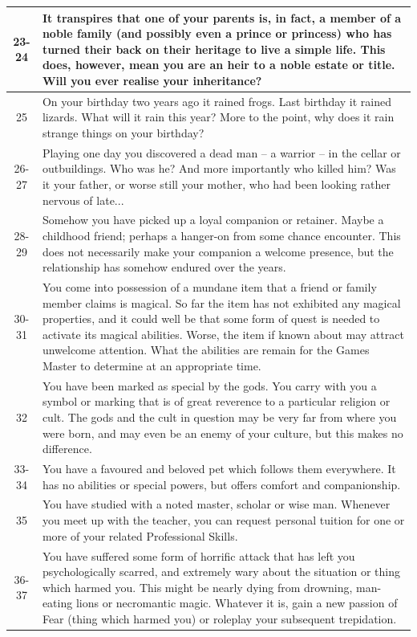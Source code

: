 \documentclass[10pt]{article}
\begin{document}
\begin{longtable}{|c|p{12cm}|}
\hline
23-24 & It transpires that one of your parents is, in fact, a member of a noble family (and possibly even a prince or princess) who has turned their back on their heritage to live a simple life. This does, however, mean you are an heir to a noble estate or title. Will you ever realise your inheritance? \\
\hline
25 & On your birthday two years ago it rained frogs. Last birthday it rained lizards. What will it rain this year? More to the point, why does it rain strange things on your birthday? \\
\hline
26-27 & Playing one day you discovered a dead man – a warrior – in the cellar or outbuildings. Who was he? And more importantly who killed him? Was it your father, or worse still your mother, who had been looking rather nervous of late... \\
\hline
28-29 & Somehow you have picked up a loyal companion or retainer. Maybe a childhood friend; perhaps a hanger-on from some chance encounter. This does not necessarily make your companion a welcome presence, but the relationship has somehow endured over the years. \\
\hline
30-31 & You come into possession of a mundane item that a friend or family member claims is magical. So far the item has not exhibited any magical properties, and it could well be that some form of quest is needed to activate its magical abilities. Worse, the item if known about may attract unwelcome attention. What the abilities are remain for the Games Master to determine at an appropriate time. \\
\hline
32 & You have been marked as special by the gods. You carry with you a symbol or marking that is of great reverence to a particular religion or cult. The gods and the cult in question may be very far from where you were born, and may even be an enemy of your culture, but this makes no difference. \\
\hline
33-34 & You have a favoured and beloved pet which follows them everywhere. It has no abilities or special powers, but offers comfort and companionship. \\
\hline
35 & You have studied with a noted master, scholar or wise man. Whenever you meet up with the teacher, you can request personal tuition for one or more of your related Professional Skills. \\
\hline
36-37 & You have suffered some form of horrific attack that has left you psychologically scarred, and extremely wary about the situation or thing which harmed you. This might be nearly dying from drowning, man-eating lions or necromantic magic. Whatever it is, gain a new passion of Fear (thing which harmed you) or roleplay your subsequent trepidation. \\

\end{longtable}
\end{document}
